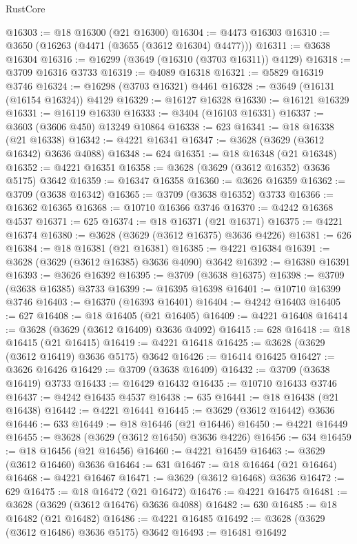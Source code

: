 \begin{lexlean}{RustCore}
\begin{coremodule}
@16303 := @18 @16300 (@21 @16300)
@16304 := @4473 @16303
@16310 := @3650 (@16263 (@4471 (@3655 (@3612 @16304) @4477)))
@16311 := @3638 @16304
@16316 := @16299 (@3649 (@16310 (@3703 @16311)) @4129)
@16318 := @3709 @16316 @3733
@16319 := @4089 @16318
@16321 := @5829 @16319 @3746
@16324 := @16298 (@3703 @16321) @4461
@16328 := @3649 (@16131 (@16154 @16324)) @4129
@16329 := @16127 @16328
@16330 := @16121 @16329
@16331 := @16119 @16330
@16333 := @3404 (@16103 @16331)
@16337 := @3603 (@3606 @450) @13249 @10864
@16338 := 623
@16341 := @18 @16338 (@21 @16338)
@16342 := @4221 @16341
@16347 := @3628 (@3629 (@3612 @16342) @3636 @4088)
@16348 := 624
@16351 := @18 @16348 (@21 @16348)
@16352 := @4221 @16351
@16358 := @3628 (@3629 (@3612 @16352) @3636 @5175) @3642
@16359 := @16347 @16358
@16360 := @3626 @16359
@16362 := @3709 (@3638 @16342)
@16365 := @3709 (@3638 @16352) @3733
@16366 := @16362 @16365
@16368 := @10710 @16366 @3746
@16370 := @4242 @16368 @4537
@16371 := 625
@16374 := @18 @16371 (@21 @16371)
@16375 := @4221 @16374
@16380 := @3628 (@3629 (@3612 @16375) @3636 @4226)
@16381 := 626
@16384 := @18 @16381 (@21 @16381)
@16385 := @4221 @16384
@16391 := @3628 (@3629 (@3612 @16385) @3636 @4090) @3642
@16392 := @16380 @16391
@16393 := @3626 @16392
@16395 := @3709 (@3638 @16375)
@16398 := @3709 (@3638 @16385) @3733
@16399 := @16395 @16398
@16401 := @10710 @16399 @3746
@16403 := @16370 (@16393 @16401)
@16404 := @4242 @16403
@16405 := 627
@16408 := @18 @16405 (@21 @16405)
@16409 := @4221 @16408
@16414 := @3628 (@3629 (@3612 @16409) @3636 @4092)
@16415 := 628
@16418 := @18 @16415 (@21 @16415)
@16419 := @4221 @16418
@16425 := @3628 (@3629 (@3612 @16419) @3636 @5175) @3642
@16426 := @16414 @16425
@16427 := @3626 @16426
@16429 := @3709 (@3638 @16409)
@16432 := @3709 (@3638 @16419) @3733
@16433 := @16429 @16432
@16435 := @10710 @16433 @3746
@16437 := @4242 @16435 @4537
@16438 := 635
@16441 := @18 @16438 (@21 @16438)
@16442 := @4221 @16441
@16445 := @3629 (@3612 @16442) @3636
@16446 := 633
@16449 := @18 @16446 (@21 @16446)
@16450 := @4221 @16449
@16455 := @3628 (@3629 (@3612 @16450) @3636 @4226)
@16456 := 634
@16459 := @18 @16456 (@21 @16456)
@16460 := @4221 @16459
@16463 := @3629 (@3612 @16460) @3636
@16464 := 631
@16467 := @18 @16464 (@21 @16464)
@16468 := @4221 @16467
@16471 := @3629 (@3612 @16468) @3636
@16472 := 629
@16475 := @18 @16472 (@21 @16472)
@16476 := @4221 @16475
@16481 := @3628 (@3629 (@3612 @16476) @3636 @4088)
@16482 := 630
@16485 := @18 @16482 (@21 @16482)
@16486 := @4221 @16485
@16492 := @3628 (@3629 (@3612 @16486) @3636 @5175) @3642
@16493 := @16481 @16492

\end{coremodule}
\end{lexlean}
